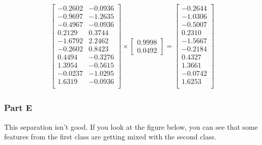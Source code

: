 \documentclass[12pt]{article}
\begin{document}
\begin{center}
    
    \begin{gather*}
        \begin{bmatrix}
            -0.2602 & -0.0936\\
            -0.9697 & -1.2635\\
            -0.4967 & -0.0936\\
            0.2129 & 0.3744\\
            -1.6792 & 2.2462\\
            -0.2602 & 0.8423\\
            0.4494 & -0.3276\\
            1.3954 & -0.5615\\
            -0.0237 & -1.0295\\
            1.6319 & -0.0936\\
        \end{bmatrix}
        \times
        \begin{bmatrix}
            0.9998\\
            0.0492
        \end{bmatrix}
        =
        \begin{bmatrix}
            -0.2644\\
            -1.0306\\
            -0.5007\\
            0.2310\\
            -1.5667\\
            -0.2184\\
            0.4327\\
            1.3661\\
            -0.0742\\
            1.6253\\
        \end{bmatrix}
    \end{gather*}
\end{center}

\pagebreak

\subsubsection{Part E}

This separation isn't good. If you look at the figure below, you can see that some features from the first class are getting mixed with the second class.
\end{document}
